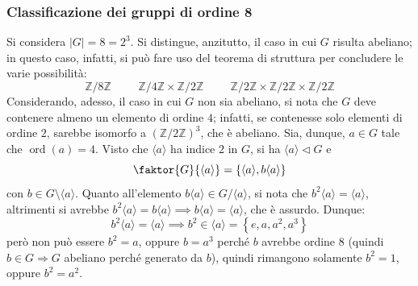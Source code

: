 \documentclass[11pt]{article}
\theoremstyle{style}
\numberwithin{equation}{subsection}
\begin{document}
\subsubsection{Classificazione dei gruppi di ordine 8}
Si considera $\lvert G \rvert  = 8 = 2^3$.
Si distingue, anzitutto, il caso in cui $G$ risulta abeliano; in questo caso, infatti, si pu\`o fare uso del teorema di struttura per concludere le varie possibilit\`a:
\[
\mathbb{Z}/8\mathbb{Z} \hspace{1cm} \mathbb{Z}/4\mathbb{Z} \times \mathbb{Z}/2\mathbb{Z}\hspace{1cm}\mathbb{Z}/2\mathbb{Z} \times \mathbb{Z}/2\mathbb{Z} \times \mathbb{Z}/2\mathbb{Z}
\] 
Considerando, adesso, il caso in cui $G$ non sia abeliano, si nota che $G$ deve contenere almeno un elemento di ordine $4$; infatti, se contenesse solo elementi di ordine $2$, sarebbe isomorfo a $(\mathbb{Z}/2\mathbb{Z})^3$, che \`e abeliano.
Sia, dunque, $a \in G $ tale che $\operatorname{ord}(a) = 4$.
Visto che $\langle a \rangle$ ha indice $2$ in $G$, si ha $\langle a \rangle\lhd G$ e 
\[
	\faktor{G}{\langle a \rangle} = \left\{ \langle a \rangle, b \langle a \rangle \right\} 
\] 
con $b \in G \setminus \langle a \rangle$.
Quanto all'elemento $b\langle a \rangle \in G / \langle a \rangle$, si nota che $b^2 \langle a \rangle = \langle a \rangle$, altrimenti si avrebbe $b^2 \langle a \rangle= b\langle a \rangle\implies b\langle a \rangle = \langle a \rangle$, che \`e assurdo.
Dunque:
\[
b^2 \langle a \rangle = \langle a \rangle\implies b^2 \in \langle a \rangle = \left\{ e , a , a^2 , a^3 \right\} 
\] 
per\`o non pu\`o essere $b^2 = a$, oppure $b=a^3$ perch\'e $b$ avrebbe ordine $8$ (quindi $b\in G\Rightarrow G$ abeliano perch\'e generato da $b$), quindi rimangono solamente $b^2 = 1$, oppure $b^2 = a^2$.
\end{document}
